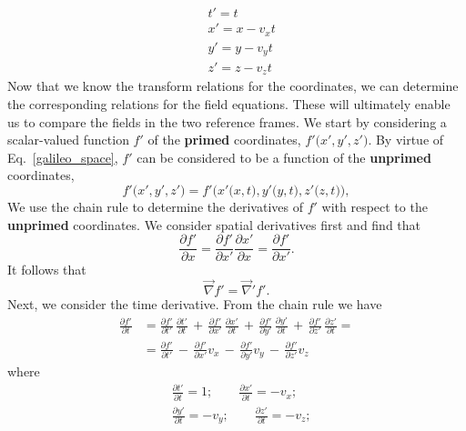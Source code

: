 \documentclass[12pt,a4paper,oneside]{book}
\begin{document}
\begin{onehalfspace}
\begin{equation}
	\begin{aligned}
		&t'=t \\[6pt]
		&x'=x - v_xt \\[6pt] 		
		&y'=y - v_yt \\[6pt] 		
		&z'=z - v_zt 	
	\end{aligned}
\end{equation} 
Now that we know the transform relations for the coordinates, we can determine 
the corresponding relations for the field equations. These will ultimately 
enable us to compare the fields in the two reference frames. We start by 
considering a scalar-valued function $f'$ of the \textbf{primed} coordinates, 
$f'\big(x',y',z'\big)$. By virtue of Eq.~\ref{galileo_space}, $f'$ can be 
considered to be a function of the \textbf{unprimed} coordinates, 
$$f'\big(x',y',z'\big)=f'\big(x'\big(x,t\big),y'\big(y,t\big),z'\big(z,t\big)\big),$$
We use the chain rule to determine the derivatives of $f'$ with respect to the 
\textbf{unprimed} coordinates. We consider spatial derivatives first and find 
that $$ \frac{\partial f'}{\partial x} =  \frac{\partial f'}{\partial x'} 
\frac{\partial x'}{\partial x} = \frac{\partial f'}{\partial x'}.$$
It follows that $$ \vec{\nabla}f'=\vec{\nabla}'f'.$$
Next, we consider the time derivative. From the chain rule we have 
\begin{equation}\label{woodson_1}
	\begin{aligned}
		\frac{\partial f'}{\partial t} &= \frac{\partial f'}{\partial 
		t'}\,\frac{\partial t'}{\partial t}\,+\,\frac{\partial f'}{\partial 
		x'}\,\frac{\partial x'}{\partial t}\,+\,\frac{\partial f'}{\partial 
		y'}\,\frac{\partial y'}{\partial t}\,+\,\frac{\partial f'}{\partial 
		z'}\,\frac{\partial z'}{\partial t} = \\[8pt]
		& = \frac{\partial f'}{\partial t'}\,-\,\frac{\partial f'}{\partial x'} 
		v_x\,-\,\frac{\partial f'}{\partial y'} v_y\,-\,\frac{\partial 
		f'}{\partial z'} v_z
	\end{aligned}
\end{equation} 
where 
\begin{equation}
	\begin{aligned} 
		&\frac{\partial t'}{\partial t} = 1; \qquad \frac{\partial x'}{\partial 
		t} = -v_x;\\[8pt]
		&\frac{\partial y'}{\partial t} = -v_y; \qquad \frac{\partial 
		z'}{\partial t} = -v_z;\\[8pt]
	\end{aligned}
\end{equation} 

\end{onehalfspace}
\end{document}
